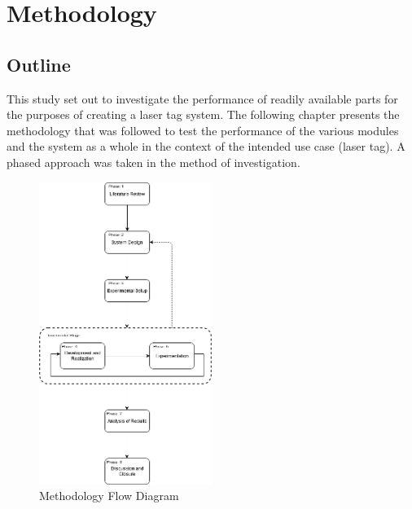 \chapter{Methodology}
\label{ch_methodology}






\section{Outline}

This study set out to investigate the performance of readily available parts for the purposes of creating a laser tag system. The following chapter presents the methodology that was followed to test the performance of the various modules and the system as a whole in the context of the intended use case (laser tag). A phased approach was taken in the method of investigation.

\begin{figure}[H]
	\centering
	\includegraphics[width=0.5\textwidth]{figures/methodology/methodology}
	\caption{Methodology Flow Diagram}
	\label{fig:methodology_overview}
\end{figure}


